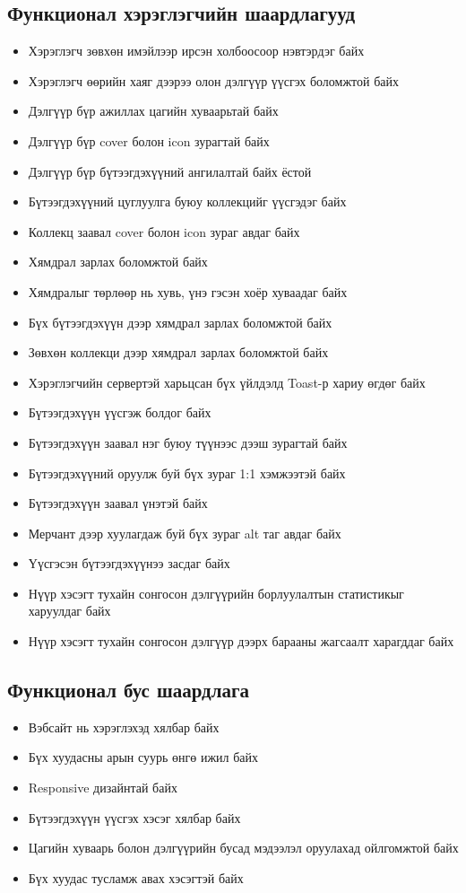 	\subsection{Функционал хэрэглэгчийн шаардлагууд}
     \begin{itemize}
        \item Хэрэглэгч зөвхөн имэйлээр ирсэн холбоосоор нэвтэрдэг байх
        \item Хэрэглэгч өөрийн хаяг дээрээ олон дэлгүүр үүсгэх боломжтой байх
        \item Дэлгүүр бүр ажиллах цагийн хуваарьтай байх
        \item Дэлгүүр бүр cover болон icon зурагтай байх
        \item Дэлгүүр бүр бүтээгдэхүүний ангилалтай байх ёстой
        \item Бүтээгдэхүүний цуглуулга буюу коллекцийг үүсгэдэг байх
        \item Коллекц заавал cover болон icon зураг авдаг байх
        \item Хямдрал зарлах боломжтой байх
        \item Хямдралыг төрлөөр нь хувь, үнэ гэсэн хоёр хуваадаг байх
        \item Бүх бүтээгдэхүүн дээр хямдрал зарлах боломжтой байх
        \item Зөвхөн коллекци дээр хямдрал зарлах боломжтой байх
        \item Хэрэглэгчийн сервертэй харьцсан бүх үйлдэлд Toast-р хариу өгдөг байх
        \item Бүтээгдэхүүн үүсгэж болдог байх
        \item Бүтээгдэхүүн заавал нэг буюу түүнээс дээш зурагтай байх
        \item Бүтээгдэхүүний оруулж буй бүх зураг 1:1 хэмжээтэй байх
        \item Бүтээгдэхүүн заавал үнэтэй байх
        \item Мерчант дээр хуулагдаж буй бүх зураг alt таг авдаг байх
        \item Үүсгэсэн бүтээгдэхүүнээ засдаг байх
        \item Нүүр хэсэгт тухайн сонгосон дэлгүүрийн борлуулалтын статистикыг харуулдаг байх
        \item Нүүр хэсэгт тухайн сонгосон дэлгүүр дээрх барааны жагсаалт харагддаг байх
    \end{itemize}
  \subsection{Функционал бус шаардлага}
    \begin{itemize}
        \item Вэбсайт нь хэрэглэхэд хялбар байх
        \item Бүх хуудасны арын суурь өнгө ижил байх
        \item Responsive дизайнтай байх
        \item Бүтээгдэхүүн үүсгэх хэсэг хялбар байх
        \item Цагийн хуваарь болон дэлгүүрийн бусад мэдээлэл оруулахад ойлгомжтой байх
        \item Бүх хуудас тусламж авах хэсэгтэй байх
    \end{itemize}
